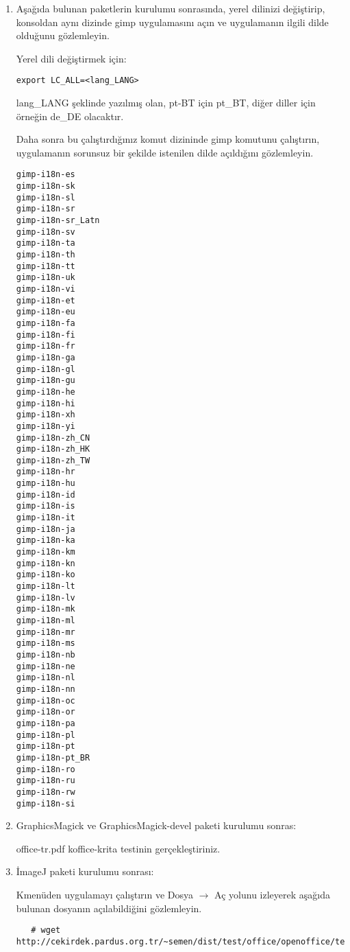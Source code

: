 \documentclass[a4paper,10pt]{article}
\begin{document}
\begin{enumerate}
Aşağıda bulunan komutların sorunsuz olarak çalıştığını gözlemleyin.
\begin{verbatim}
# wget http://cekirdek.pardus.org.tr/~semen/dist/test/multimedia/graphics/test_graphviz.mm
# mm2gv  test_graphviz.mm -o test.gv
# dotty test.gv
# gv2gxl test.gv -o test.gxl 
# gxl2dot test.gxl test.dot
# acyclic test.dot test_asyclic.dot
# lneato test.dot
# vimdot test.dot
\end{verbatim}




 \item Aşağıda bulunan paketlerin kurulumu sonrasında, yerel dilinizi değiştirip, konsoldan aynı dizinde gimp uygulamasını açın ve uygulamanın ilgili dilde olduğunu gözlemleyin.

Yerel dili değiştirmek için:
\begin{verbatim}
export LC_ALL=<lang_LANG>
\end{verbatim}

lang\_LANG şeklinde yazılmış olan, pt-BT için pt\_BT, diğer diller için örneğin de\_DE olacaktır.

Daha sonra bu çalıştırdığınız komut dizininde gimp komutunu çalıştırın, uygulamanın sorunsuz bir şekilde istenilen dilde açıldığını gözlemleyin.
\begin{verbatim}
gimp-i18n-es
gimp-i18n-sk
gimp-i18n-sl
gimp-i18n-sr
gimp-i18n-sr_Latn
gimp-i18n-sv
gimp-i18n-ta
gimp-i18n-th
gimp-i18n-tt
gimp-i18n-uk
gimp-i18n-vi
gimp-i18n-et
gimp-i18n-eu
gimp-i18n-fa
gimp-i18n-fi
gimp-i18n-fr
gimp-i18n-ga
gimp-i18n-gl
gimp-i18n-gu
gimp-i18n-he
gimp-i18n-hi
gimp-i18n-xh
gimp-i18n-yi
gimp-i18n-zh_CN
gimp-i18n-zh_HK
gimp-i18n-zh_TW
gimp-i18n-hr
gimp-i18n-hu
gimp-i18n-id
gimp-i18n-is
gimp-i18n-it
gimp-i18n-ja
gimp-i18n-ka
gimp-i18n-km
gimp-i18n-kn
gimp-i18n-ko
gimp-i18n-lt
gimp-i18n-lv
gimp-i18n-mk
gimp-i18n-ml
gimp-i18n-mr
gimp-i18n-ms
gimp-i18n-nb
gimp-i18n-ne
gimp-i18n-nl
gimp-i18n-nn
gimp-i18n-oc
gimp-i18n-or
gimp-i18n-pa
gimp-i18n-pl
gimp-i18n-pt
gimp-i18n-pt_BR
gimp-i18n-ro
gimp-i18n-ru
gimp-i18n-rw
gimp-i18n-si 
\end{verbatim}


 \item GraphicsMagick ve GraphicsMagick-devel paketi kurulumu sonras:

office-tr.pdf koffice-krita testinin gerçekleştiriniz.

 \item İmageJ paketi kurulumu sonrası:

 Kmenüden uygulamayı çalıştırın ve Dosya $\rightarrow$ Aç yolunu izleyerek aşağıda bulunan dosyanın açılabildiğini gözlemleyin.
  \begin{verbatim}
   # wget http://cekirdek.pardus.org.tr/~semen/dist/test/office/openoffice/test_oodraw.jpg
  \end{verbatim}


\end{enumerate}
\end{document}

